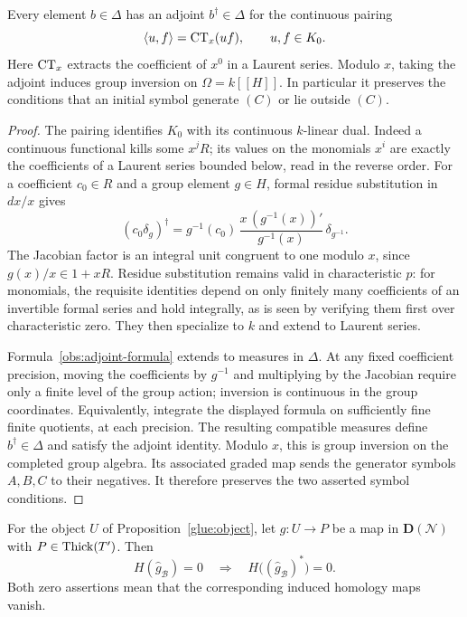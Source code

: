 \begin{lemma}
\label{obs:adjoint}
Every element $b\in\Delta$ has an adjoint $b^\dagger\in\Delta$
for the continuous pairing
\[
 \langle u,f\rangle=\operatorname{CT}_x(uf),\qquad u,f\in K_0.
\]
Here $\operatorname{CT}_x$ extracts the coefficient of $x^0$ in a Laurent series.
Modulo $x$, taking the adjoint induces group inversion on
$\Omega=k[[H]]$.  In particular it preserves the conditions
that an initial symbol generate $(C)$ or lie outside $(C)$.
\end{lemma}

\begin{proof}
The pairing identifies $K_0$ with its continuous $k$-linear dual.
Indeed a continuous functional kills some $x^jR$; its values on
the monomials $x^i$ are exactly the coefficients of a Laurent
series bounded below, read in the reverse order.
For a coefficient $c_0\in R$ and a group element $g\in H$,
formal residue substitution in $dx/x$ gives
\begin{equation}
\label{obs:adjoint-formula}
 (c_0\delta_g)^\dagger
 =g^{-1}(c_0)\,
   \frac{x\,(g^{-1}(x))'}{g^{-1}(x)}\,
   \delta_{g^{-1}}.
\end{equation}
The Jacobian factor is an integral unit congruent to one modulo
$x$, since $g(x)/x\in1+xR$.
Residue substitution remains valid in characteristic $p$:
for monomials, the requisite identities depend on only finitely
many coefficients of an invertible formal series and hold
integrally, as is seen by verifying them first over characteristic
zero.  They then specialize to $k$ and extend to Laurent series.

Formula~\eqref{obs:adjoint-formula} extends to measures in
$\Delta$.  At any fixed coefficient precision, moving the
coefficients by $g^{-1}$ and multiplying by the Jacobian require
only a finite level of the group action; inversion is continuous
in the group coordinates.  Equivalently, integrate the displayed
formula on sufficiently fine finite quotients, at each precision.
The resulting compatible measures define $b^\dagger\in\Delta$
and satisfy the adjoint identity.  Modulo $x$, this is group
inversion on the completed group algebra.  Its associated graded
map sends the generator symbols $A,B,C$ to their negatives.
It therefore preserves the two asserted symbol conditions.
\end{proof}

\begin{proposition}
\label{obs:dual-ghost}
For the object $U$ of Proposition~\ref{glue:object}, let
$g:U\to P$ be a map in $\mathbf D(\mathcal N)$ with
$P\in\operatorname{Thick}(T')$.  Then
\begin{equation}
\label{obs:ghost-implication}
 H(\widehat g_{\mathscr B})=0
 \quad\Longrightarrow\quad
 H\bigl((\widehat g_{\mathscr B})^*\bigr)=0.
\end{equation}
Both zero assertions mean that the corresponding induced homology
maps vanish.
\end{proposition}

